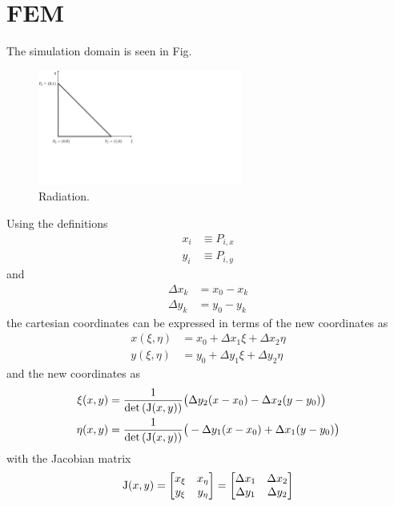 \chapter{FEM}
The simulation domain is seen in Fig.
\begin{figure}[H]
	\centering
	\includegraphics[trim= 0cm 7cm 18cm 0cm ,clip,width=0.6\textwidth]{figures/FEM_triangle.png}
	\caption{Radiation.}
	\label{fig:FEM_domain}
\end{figure}
Using the definitions
\begin{align}
	x_i &\equiv P_{i,x} \\
	y_i &\equiv P_{i,y}
\end{align}
and
\begin{align}
	\Delta x_k &= x_0 - x_k\\
	\Delta y_k &= y_0 - y_k
\end{align}
the cartesian coordinates can be expressed in terms of the new coordinates as
\begin{align}
	x(\xi, \eta) &= x_0 + \Delta x_1 \xi + \Delta x_2 \eta\\
	y(\xi, \eta) &= y_0 + \Delta y_1 \xi + \Delta y_2 \eta
\end{align}
and the new coordinates as
\begin{align}
	\xi(x, y) & = \frac{1}{\det\left(\mathrm{J}(x,y) \right)} \big(\Delta y_2 (x - x_0) - \Delta x_2 (y - y_0) \big)\\
	\eta(x, y) & = \frac{1}{\det\left(\mathrm{J}(x,y) \right)} \big(-\Delta y_1 (x - x_0) + \Delta x_1(y - y_0) \big)
\end{align}
with the Jacobian matrix
\begin{equation}
	\mathrm{J}(x,y) =
	\begin{bmatrix}
	x_{\xi} & x_{\eta} \\
	y_{\xi} & y_{\eta}
	\end{bmatrix}
	=
	\begin{bmatrix}
	\Delta x_{1} & \Delta x_{2}\\
	\Delta y_{1} & \Delta y_{2}
	\end{bmatrix}
\end{equation}
